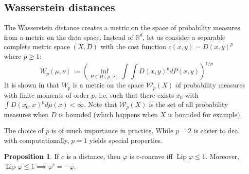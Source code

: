 \documentclass{article}
\theoremstyle{definition}
\newtheorem{prop}{Proposition}[section]
\theoremstyle{remark}
\DeclareMathOperator{\lip}{Lip}
\begin{document}
\subsection{Wasserstein distances}

The Wasserstein distance creates a metric on the space of probability measures from a metric on the data space. Instead of $\mathbb R^d$, let us consider a separable complete metric space $(X,D)$ with the cost function $c(x,y) = D(x,y)^p$ where $p\geq 1$:
$$W_p(\mu, \nu) := \left(\inf_{P\in \Pi(\mu, \nu)} \int\int D(x,y)^p dP(x,y) \right)^{1/p}$$
It is shown in \cite{villani2003topics} that $W_p$ is a metric on the space $\mathcal W_p(X)$ of probability measures with finite moments of order $p$, i.e. such that there exists $x_0$ with $\int D(x_0,x)^p d\mu(x) <\infty$. Note that $\mathcal W_p(X)$ is the set of all probability measures when $D$ is bounded (which happens when $X$ is bounded for example).

The choice of $p$ is of much importance in practice. While $p=2$ is easier to deal with computationally, $p=1$ yields special properties.
\begin{prop}
If $c$ is a distance, then $\varphi$ is $c$-concave iff $\lip \varphi \leq 1$. Moreover, $\lip \varphi \leq 1 \implies \varphi^c = -\varphi$.
\end{prop}
\end{document}
